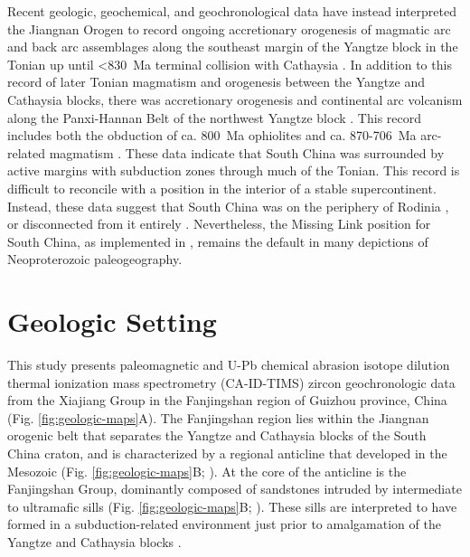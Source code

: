 Recent geologic, geochemical, and geochronological data have instead interpreted the Jiangnan Orogen to record ongoing accretionary orogenesis of magmatic arc and back arc assemblages along the southeast margin of the Yangtze block in the Tonian up until \textless830~Ma terminal collision with Cathaysia \citep{Cawood2017a, Yan2019a}. In addition to this record of later Tonian magmatism and orogenesis between the Yangtze and Cathaysia blocks, there was accretionary orogenesis and continental arc volcanism along the Panxi-Hannan Belt of the northwest Yangtze block \citep{Cawood2017a}. This record includes both the obduction of ca. 800~Ma ophiolites \citep{Zhao2017a} and ca. 870-706~Ma arc-related magmatism \citep{Dong2012a}. These data indicate that South China was surrounded by active margins with subduction zones through much of the Tonian. This record is difficult to reconcile with a position in the interior of a stable supercontinent. Instead, these data suggest that South China was on the periphery of Rodinia \citep{Cawood2017a}, or disconnected from it entirely \citep{Merdith2017a}. Nevertheless, the Missing Link position for South China, as implemented in \citet{Li2008a}, remains the default in many depictions of Neoproterozoic paleogeography.

\section{Geologic Setting}

This study presents paleomagnetic and U-Pb chemical abrasion isotope dilution thermal ionization mass spectrometry (CA-ID-TIMS) zircon geochronologic data from the Xiajiang Group in the Fanjingshan region of Guizhou province, China (Fig. \ref{fig:geologic-maps}A). The Fanjingshan region lies within the Jiangnan orogenic belt that separates the Yangtze and Cathaysia blocks of the South China craton, and is characterized by a regional anticline that developed in the Mesozoic (Fig. \ref{fig:geologic-maps}B; \citealp{Li2016c, Ma2019a}). At the core of the anticline is the Fanjingshan Group, dominantly composed of sandstones intruded by intermediate to ultramafic sills (Fig. \ref{fig:geologic-maps}B; \citealp{Wang2014a}). These sills are interpreted to have formed in a subduction-related environment just prior to amalgamation of the Yangtze and Cathaysia blocks \citep{Wang2014a}.

